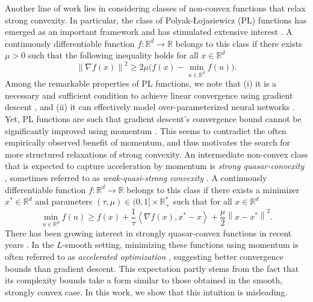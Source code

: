 \documentclass{article}
\def\R{{\mathbb{R}}}
\newcommand{\norm}[1]{\left\lVert#1\right\rVert}
\newcommand{\dotprod}[1]{\left< #1\right>}
\theoremstyle{plain}
\theoremstyle{definition}
\theoremstyle{remark}
\begin{document}
Another line of work lies in considering classes of non-convex functions that relax strong convexity.
In particular, the class of Polyak-\L{}ojasiewicz (PL) functions \cite{Polyak1963,lojasiewicz1963topological} has emerged as an important framework and has stimulated extensive interest \cite{karimi2016linear,fazel2018global,oymak2019overparameterized,altschuler2021averaging,merigot2021non,apidopoulos2022convergence,apidopoulos2025heavy,gess2023exponential}. A continuously differentiable function $f:\R^d \to \R $ belongs to this class if there exists $\mu>0$ such that the following inequality holds for all $x\in\R^d$
\[ \norm{\nabla f(x)}^2 \ge 2\mu\Big(f(x)-\min_{u\in \R^d}f(u)\Big).\]
Among the remarkable properties of PL functions, we note that (i) it is a necessary and sufficient condition to achieve linear convergence using gradient descent \cite{abbaszadehpeivasti2023conditions}, and (ii) it can effectively model over-parameterized neural networks \cite{ liu2022loss,barboni2022global,chen2023overparameterized, xulocal}. Yet, PL functions are such that gradient descent's convergence bound cannot be significantly improved using momentum \cite{PLlowerbound}. This seems to contradict the often empirically observed benefit of momentum, and thus motivates the search for more structured relaxations of strong convexity.
An intermediate non-convex class that is expected to capture acceleration by momentum is \textit{strong quasar-convexity} \cite{hinder2020near}, sometimes referred to as \textit{weak-quasi-strong convexity }\cite{necoara2019linear,bu2020note}. A continuously differentiable function $f:\R^d \to \R $ belongs to this class if there exists a minimizer $x^\ast\in \R^d$ and parameters $(\tau,\mu) \in (0,1]\times \R_+^{\ast}$ such that for all $x\in \R^d$
\[\min_{u\in \R^d}f(u) \ge f(x) + \frac{1}{\tau}\dotprod{\nabla f(x),x^\ast-x} + \frac{\mu}{2}\norm{x-x^\ast}^2.\]
There has been growing interest in strongly quasar-convex functions in recent years \cite{gower2021sgd,wang2023continuized,alimisis2024characterization,alimisis2024geodesic,pun2024online,hermant2025continuized,chenefficient2025,lara2025delayed,de2025extending,farzin2025minimisation}.
In the $L$-smooth setting, minimizing these functions using momentum is often referred to as \textit{accelerated optimization} \cite{hinder2020near,fu2023accelerated,hermant2024study}, suggesting better convergence bounds than gradient descent. This expectation partly stems from the fact that its complexity bounds take a form similar to those obtained in the smooth, strongly convex case. In this work, we show that this intuition is misleading.
\end{document}
